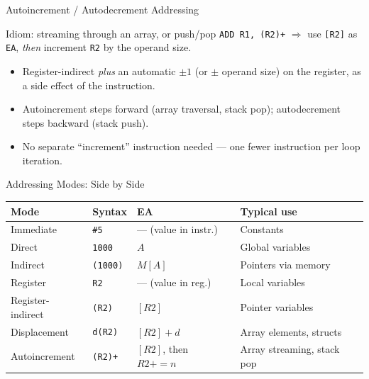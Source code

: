 \documentclass[aspectratio=169]{beamer}
\begin{document}
\begin{frame}{Autoincrement / Autodecrement Addressing}
  \begin{exampleblock}{Idiom: streaming through an array, or push/pop}
    \texttt{ADD R1, (R2)+} \quad $\Rightarrow$ \quad use \texttt{[R2]} as \texttt{EA},
    \emph{then} increment \texttt{R2} by the operand size.
  \end{exampleblock}
  \begin{itemize}
    \item Register-indirect \emph{plus} an automatic $\pm 1$ (or $\pm$ operand size)
      on the register, as a side effect of the instruction.
    \item Autoincrement steps forward (array traversal, stack pop); autodecrement
      steps backward (stack push).
    \item No separate ``increment'' instruction needed --- one fewer instruction per
      loop iteration.
  \end{itemize}
\end{frame}

\begin{frame}{Addressing Modes: Side by Side}
  \footnotesize
  \begin{tabular}{@{}p{2.6cm}p{2.9cm}p{2.6cm}p{3.6cm}@{}}
    \toprule
    \textbf{Mode} & \textbf{Syntax} & \textbf{EA} & \textbf{Typical use} \\
    \midrule
    Immediate        & \texttt{\#5}     & --- (value in instr.) & Constants \\
    Direct            & \texttt{1000}    & $A$                    & Global variables \\
    Indirect          & \texttt{(1000)}  & $M[A]$                 & Pointers via memory \\
    Register          & \texttt{R2}      & --- (value in reg.)   & Local variables \\
    Register-indirect  & \texttt{(R2)}    & $[R2]$                 & Pointer variables \\
    Displacement       & \texttt{d(R2)}   & $[R2] + d$             & Array elements, structs \\
    Autoincrement      & \texttt{(R2)+}   & $[R2]$, then $R2 {+}{=} n$ & Array streaming, stack pop \\
    \bottomrule
  \end{tabular}
  \vspace{0.2cm}
  \begin{center}
  \end{center}
\end{frame}
\end{document}
